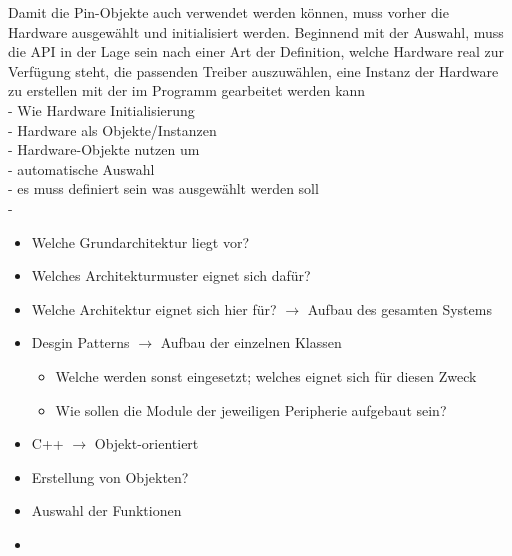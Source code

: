 Damit die Pin-Objekte auch verwendet werden können, muss vorher die Hardware ausgewählt und initialisiert werden.
Beginnend mit der Auswahl, muss die API in der Lage sein nach einer Art der Definition, welche Hardware real zur Verfügung steht, die passenden Treiber auszuwählen, eine Instanz der Hardware zu erstellen mit der im Programm gearbeitet werden kann
\\
- Wie Hardware Initialisierung \\
- Hardware als Objekte/Instanzen \\
- Hardware-Objekte nutzen um  \\
- automatische Auswahl \\
- es muss definiert sein was ausgewählt werden soll \\
- 


\begin{itemize}
	\item Welche Grundarchitektur liegt vor?
	\item Welches Architekturmuster eignet sich dafür?
	\item Welche Architektur eignet sich hier für? $\rightarrow$ Aufbau des gesamten Systems
	\item Desgin Patterns $\rightarrow$ Aufbau der einzelnen Klassen
	\begin{itemize}
		\item Welche werden sonst eingesetzt; welches eignet sich für diesen Zweck
		\item Wie sollen die Module der jeweiligen Peripherie aufgebaut sein?
	\end{itemize}
	\item C++ $\rightarrow$ Objekt-orientiert
	\item Erstellung von Objekten?
	\item Auswahl der Funktionen
	\item 
\end{itemize}

